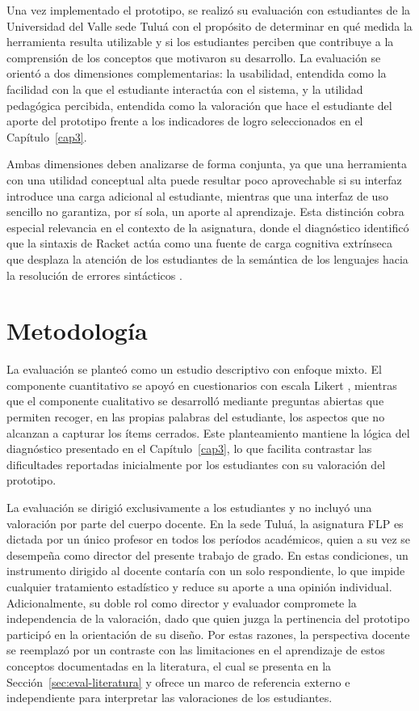 Una vez implementado el prototipo, se realizó su evaluación con estudiantes de la Universidad del Valle sede Tuluá con el propósito de determinar en qué medida la herramienta resulta utilizable y si los estudiantes perciben que contribuye a la comprensión de los conceptos que motivaron su desarrollo. La evaluación se orientó a dos dimensiones complementarias: la usabilidad, entendida como la facilidad con la que el estudiante interactúa con el sistema, y la utilidad pedagógica percibida, entendida como la valoración que hace el estudiante del aporte del prototipo frente a los indicadores de logro seleccionados en el Capítulo~\ref{cap3}.

Ambas dimensiones deben analizarse de forma conjunta, ya que una herramienta con una utilidad conceptual alta puede resultar poco aprovechable si su interfaz introduce una carga adicional al estudiante, mientras que una interfaz de uso sencillo no garantiza, por sí sola, un aporte al aprendizaje. Esta distinción cobra especial relevancia en el contexto de la asignatura, donde el diagnóstico identificó que la sintaxis de Racket actúa como una fuente de carga cognitiva extrínseca que desplaza la atención de los estudiantes de la semántica de los lenguajes hacia la resolución de errores sintácticos \cite{sweller2024cognitive}.

\section{Metodología}

La evaluación se planteó como un estudio descriptivo con enfoque mixto. El componente cuantitativo se apoyó en cuestionarios con escala Likert \cite{joshi2015likert}, mientras que el componente cualitativo se desarrolló mediante preguntas abiertas que permiten recoger, en las propias palabras del estudiante, los aspectos que no alcanzan a capturar los ítems cerrados. Este planteamiento mantiene la lógica del diagnóstico presentado en el Capítulo~\ref{cap3}, lo que facilita contrastar las dificultades reportadas inicialmente por los estudiantes con su valoración del prototipo.

La evaluación se dirigió exclusivamente a los estudiantes y no incluyó una valoración por parte del cuerpo docente. En la sede Tuluá, la asignatura FLP es dictada por un único profesor en todos los períodos académicos, quien a su vez se desempeña como director del presente trabajo de grado. En estas condiciones, un instrumento dirigido al docente contaría con un solo respondiente, lo que impide cualquier tratamiento estadístico y reduce su aporte a una opinión individual. Adicionalmente, su doble rol como director y evaluador compromete la independencia de la valoración, dado que quien juzga la pertinencia del prototipo participó en la orientación de su diseño. Por estas razones, la perspectiva docente se reemplazó por un contraste con las limitaciones en el aprendizaje de estos conceptos documentadas en la literatura, el cual se presenta en la Sección~\ref{sec:eval-literatura} y ofrece un marco de referencia externo e independiente para interpretar las valoraciones de los estudiantes.

